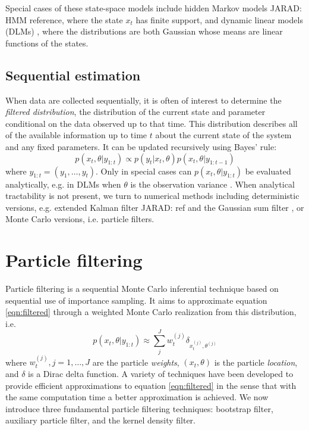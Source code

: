 \documentclass{article}
\newcommand{\jarad}[1]{{\color{red}JARAD: #1}}
\begin{document}
Special cases of these state-space models include hidden Markov models \jarad{HMM reference}, where the state $x_t$ has finite support, and dynamic linear models (DLMs) \citep{West:Harr:baye:1997}, where the distributions are both Gaussian whose means are linear functions of the states.

\subsection{Sequential estimation}

When data are collected sequentially, it is often of interest to determine the \emph{filtered distribution}, the distribution of the current state and parameter conditional on the data observed up to that time. This distribution describes all of the available information up to time $t$ about the current state of the system and any fixed parameters. It can be updated recursively using Bayes' rule:
\begin{equation}
p(x_t,\theta| y_{1:t}) \propto p(y_t|x_t,\theta)p(x_t,\theta|y_{1:t-1}) \label{eqn:filtered}
\end{equation}
where $y_{1:t} = (y_1,\ldots,y_t)$. Only in special cases can $p(x_t,\theta| y_{1:t})$ be evaluated analytically, e.g. in DLMs when $\theta$ is the observation variance \cite[Sec 4.3,][]{petris2009dynamic}. When analytical tractability is not present, we turn to numerical methods including deterministic versions, e.g. extended Kalman filter \jarad{ref} and the Gaussian sum filter \citep{Alsp:Sore:nonl:1972}, or Monte Carlo versions, i.e. particle filters.

\section{Particle filtering \label{sec:filtering}}

Particle filtering is a sequential Monte Carlo inferential technique based on sequential use of importance sampling. It aims to approximate equation \eqref{eqn:filtered} through a weighted Monte Carlo realization from this distribution, i.e.
\begin{equation}
p(x_t,\theta| y_{1:t}) \approx \sum_{j}^J w_t^{(j)} \delta_{x_t^{(j)},\theta^{(j)}} \label{eqn:particle}
\end{equation}
where $w_t^{(j)},j=1,\ldots,J$ are the particle \emph{weights}, $(x_t,\theta)$ is the particle \emph{location}, and $\delta$ is a Dirac delta function. A variety of techniques have been developed to provide efficient approximations to equation \eqref{eqn:filtered} in the sense that with the same computation time a better approximation is achieved. We now introduce three fundamental particle filtering techniques: bootstrap filter, auxiliary particle filter, and the kernel density filter.
\end{document}
